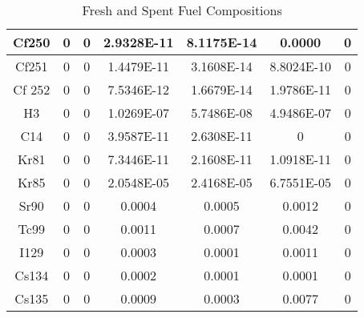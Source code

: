 \begin{table}[h]
{\begin{tabular}{|c|c|c|c|c|c|c|}
			  Cf250	 & 	0& 	0 & 	2.9328E-11 & 	8.1175E-14 & 	0.0000 & 	0 \\ \hline 
			  Cf251	 & 	0& 	0 & 	1.4479E-11 & 	3.1608E-14 & 	8.8024E-10 & 	0 \\ \hline 
			  Cf 252	 & 	0& 	0 & 	7.5346E-12 & 	1.6679E-14 & 	1.9786E-11 & 	0 \\ \hline 
			  H3	 & 	0& 	0 & 	1.0269E-07 & 	5.7486E-08 & 	4.9486E-07 & 	0 \\ \hline 
			  C14	 & 	0& 	0 & 	3.9587E-11 & 	2.6308E-11 & 	0 & 	0 \\ \hline 
			  Kr81	 & 	0& 	0 & 	7.3446E-11 & 	2.1608E-11 & 	1.0918E-11 & 	0 \\ \hline 
			  Kr85	 & 	0& 	0 & 	2.0548E-05 & 	2.4168E-05 & 	6.7551E-05 & 	0 \\ \hline 
			  Sr90	 & 	0& 	0 & 	0.0004 & 	0.0005 & 	0.0012 & 	0 \\ \hline 
			  Tc99	 & 	0& 	0 & 	0.0011 & 	0.0007 & 	0.0042 & 	0 \\ \hline 
			  I129	 & 	0& 	0 & 	0.0003 & 	0.0001 & 	0.0011 & 	0 \\ \hline 
			  Cs134	 & 	0& 	0 & 	0.0002 & 	0.0001 & 	0.0001 & 	0 \\ \hline 
			  Cs135	 & 	0& 	0 & 	0.0009 & 	0.0003 & 	0.0077 & 	0 \\ \hline 
			  
			 
		\end{tabular}}
		\caption{Fresh and Spent Fuel Compositions}
		\label{tab:comp}
\end {table}
